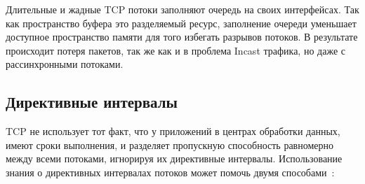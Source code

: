 \documentclass[14pt, a4paper,oneside]{extarticle}
\begin{document}
Длительные и жадные TCP потоки заполняют очередь на своих интерфейсах. Так как пространство буфера это разделяемый ресурс, заполнение очереди уменьшает доступное пространство памяти для того избегать разрывов потоков. В результате происходит потеря пакетов, так же как и в проблема Incast трафика, но даже с рассинхронными потоками.

\subsection{Директивные интервалы}

TCP не использует тот факт, что у приложений в центрах обработки данных, имеют сроки выполнения, и разделяет пропускную способность равномерно между всеми потоками, игнорируя их директивные интервалы. Использование знания о директивных интервалах потоков может помочь двумя способами~\cite{d3tcp}:
\end{document}
